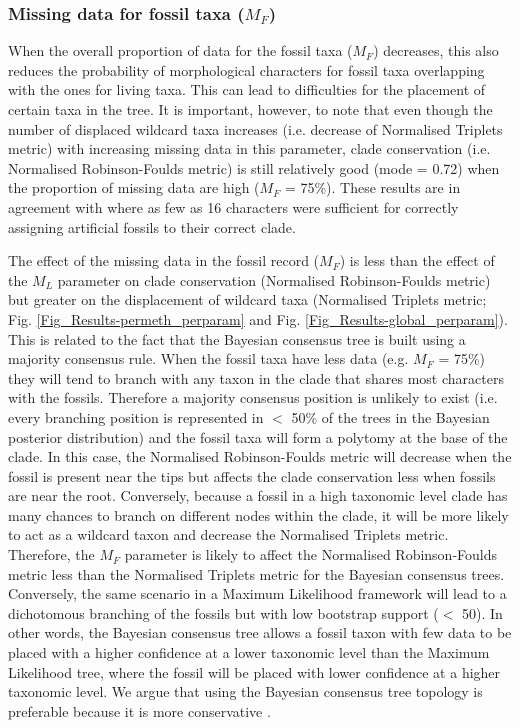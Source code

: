 \subsubsection*{Missing data for fossil taxa ($M_{F}$)}
When the overall proportion of data for the fossil taxa ($M_{F}$) decreases, this also reduces the probability of morphological characters for fossil taxa overlapping with the ones for living taxa.
This can lead to difficulties for the placement of certain taxa in the tree.
It is important, however, to note that even though the number of displaced wildcard taxa increases (i.e. decrease of Normalised Triplets metric) with increasing missing data in this parameter, clade conservation (i.e. Normalised Robinson-Foulds metric) is still relatively good (mode = 0.72) when the proportion of missing data are high ($M_{F}$ = 75\%).
These results are in agreement with \cite{manosphylogeny2007} where as few as 16 characters were sufficient for correctly assigning artificial fossils to their correct clade.

The effect of the missing data in the fossil record ($M_{F}$) is less than the effect of the $M_{L}$ parameter on clade conservation (Normalised Robinson-Foulds metric) but greater on the displacement of wildcard taxa (Normalised Triplets metric; Fig. \ref{Fig_Results-permeth_perparam} and Fig. \ref{Fig_Results-global_perparam}).
This is related to the fact that the Bayesian consensus tree is built using a majority consensus rule.
When the fossil taxa have less data (e.g. $M_{F}$ = 75\%) they will tend to branch with any taxon in the clade that shares most characters with the fossils.
Therefore a majority consensus position is unlikely to exist (i.e. every branching position is represented in $<$ 50\% of the trees in the Bayesian posterior distribution) and the fossil taxa will form a polytomy at the base of the clade.
In this case, the Normalised Robinson-Foulds metric will decrease when the fossil is present near the tips but affects the clade conservation less when fossils are near the root.
Conversely, because a fossil in a high taxonomic level clade has many chances to branch on different nodes within the clade, it will be more likely to act as a wildcard taxon and decrease the Normalised Triplets metric.
Therefore, the $M_{F}$ parameter is likely to affect the Normalised Robinson-Foulds metric less than the Normalised Triplets metric for the Bayesian consensus trees.
Conversely, the same scenario in a Maximum Likelihood framework will lead to a dichotomous branching of the fossils but with low bootstrap support ($<$ 50).
In other words, the Bayesian consensus tree allows a fossil taxon with few data to be placed with a higher confidence at a lower taxonomic level than the Maximum Likelihood tree, where the fossil will be placed with lower confidence at a higher taxonomic level.
We argue that using the Bayesian consensus tree topology is preferable because it is more conservative \citep[e.g.][]{pattinsonphylogeny2014}.

